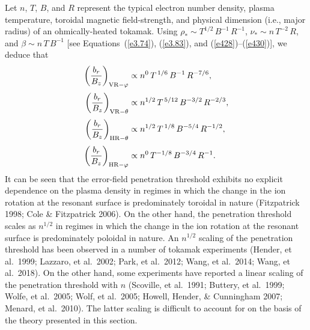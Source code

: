 \documentclass[notitlepage,12pt]{article}
\begin{document}
Let $n$, $T$, $B$, and $R$ represent the typical electron number density, plasma temperature, toroidal magnetic field-strength,
and physical dimension (i.e., major radius) of an ohmically-heated tokamak. Using $\rho_\ast\sim T^{1/2}\,B^{-1}\,R^{-1}$, 
$\nu_\ast\sim n\,T^{-2}\,R$, and $\beta\sim n\,T\,B^{-1}$ [see Equations~(\ref{e3.74}), (\ref{e3.83}), and (\ref{e428})--(\ref{e430})],
we deduce that
\begin{align}
\left(\frac{b_{r}}{B_z}\right)_{{\rm VR}-\varphi} &\propto n^{0}\,T^{\,1/6}\,B^{-1}\,R^{-7/6},\\[0.5ex]
\left(\frac{b_{r}}{B_z}\right)_{{\rm VR}-\theta} &\propto n^{1/2}\,T^{\,5/12}\,B^{-3/2}\,R^{-2/3},\\[0.5ex]
\left(\frac{b_{r}}{B_z}\right)_{{\rm HR}-\theta} &\propto n^{1/2}\,T^{\,1/8}\,B^{-5/4}\,R^{-1/2},\\[0.5ex]
\left(\frac{b_{r}}{B_z}\right)_{{\rm HR}-\varphi} &\propto n^{0}\,T^{-1/8}\,B^{-3/4}\,R^{-1}.
\end{align}
It can be seen that the error-field penetration threshold exhibits no explicit dependence on the plasma
density in regimes in which the change in the ion rotation at the resonant surface is predominately toroidal
in nature (Fitzpatrick 1998; Cole \& Fitzpatrick 2006). On the other hand, the penetration threshold
scales as $n^{1/2}$ in regimes in which the change in the ion rotation at the resonant surface is predominately poloidal 
in nature. An $n^{1/2}$ scaling of the penetration threshold has been observed in a number of tokamak
experiments (Hender, et al.\ 1999; Lazzaro, et al.\ 2002; Park, et al.\ 2012; Wang, et al.\ 2014; Wang, et al.\ 2018). 
On the other hand, some experiments have reported a linear scaling of the penetration threshold with $n$ (Scoville, et al.\ 1991; Buttery, et al.\ 1999; Wolfe, et al.\ 2005; Wolf, et al.\ 2005; Howell, Hender, \& Cunningham 2007; Menard, et al.\ 2010). The latter
scaling is difficult to account for on the basis of the theory presented in this section. 
\end{document}
